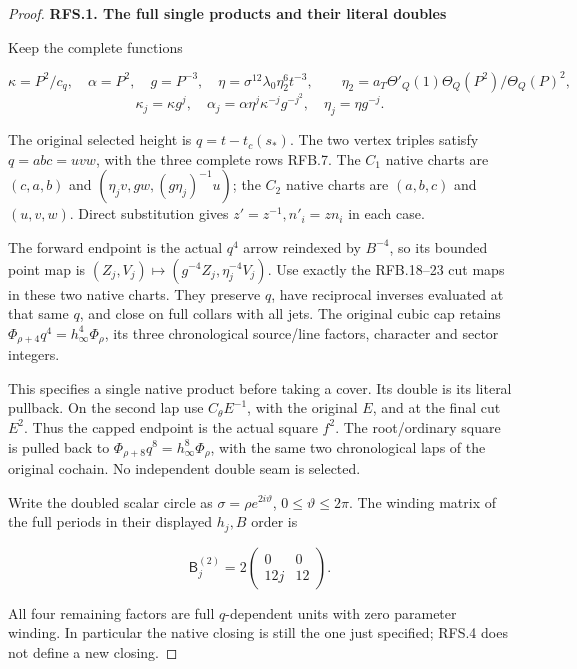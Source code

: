 \begin{proof}
\par

\medskip\noindent\textbf{RFS.1. The full single products and their literal doubles}

\par\nobreak

Keep the complete functions

\[
 \kappa=P^2/c_q,\quad\alpha=P^2,\quad g=P^{-3},\quad
 \eta=\sigma^{12}\lambda_0\eta_2^6t^{-3},\qquad
 \eta_2=a_T\Theta'_Q(1)\Theta_Q(P^2)/\Theta_Q(P)^2,
\]
\[
 \kappa_j=\kappa g^j,\quad
 \alpha_j=\alpha\eta^j\kappa^{-j}g^{-j^2},\quad
 \eta_j=\eta g^{-j}.
 \tag{RFS.3}
\]

The original selected height is \(q=t-t_c(s_*)\). The two vertex
triples satisfy \(q=abc=uvw\), with the three complete rows RFB.7.
The \(C_1\) native charts are
\((c,a,b)\) and \((\eta_jv,gw,(g\eta_j)^{-1}u)\);
the \(C_2\) native charts are \((a,b,c)\) and \((u,v,w)\).
Direct substitution gives \(z'=z^{-1},n'_i=zn_i\) in each case.

The forward endpoint is the actual \(q^4\) arrow reindexed by
\(B^{-4}\), so its bounded point map is
\((Z_j,V_j)\mapsto(g^{-4}Z_j,\eta_j^{-4}V_j)\).
Use exactly the RFB.18--23 cut maps in these two native charts.
They preserve \(q\), have reciprocal inverses evaluated at that
same \(q\), and close on full collars with all jets. The original
cubic cap retains \(\Phi_{\rho+4}q^4=h_\infty^4\Phi_\rho\), its
three chronological source/line factors, character and sector integers.

This specifies a single native product before taking a cover. Its
double is its literal pullback. On the second lap use
\(C_\theta E^{-1}\), with the original \(E\), and at the final cut
\(E^2\). Thus the capped endpoint is the actual square \(f^2\).
The root/ordinary square is pulled back to
\(\Phi_{\rho+8}q^8=h_\infty^8\Phi_\rho\), with the same two
chronological laps of the original cochain. No independent double
seam is selected.

Write the doubled scalar circle as \(\sigma=\rho e^{2i\vartheta}\),
\(0\le\vartheta\le2\pi\). The winding matrix of the full periods
in their displayed \(h_j,B\) order is

\[
 \mathsf B_j^{(2)}=2\begin{pmatrix}0&0\\12j&12\end{pmatrix}.
 \tag{RFS.4}
\]

All four remaining factors are full \(q\)-dependent units with
zero parameter winding. In particular the native closing is still
the one just specified; RFS.4 does not define a new closing.


\end{proof}
